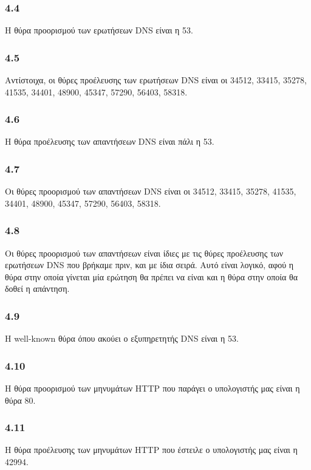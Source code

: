 		\subsubsection*{4.4}
			Η θύρα προορισμού των ερωτήσεων DNS είναι η 53.
		
		\subsubsection*{4.5}
			Αντίστοιχα, οι θύρες προέλευσης των ερωτήσεων DNS είναι οι 34512, 33415, 35278, 41535, 34401, 48900, 45347, 57290, 56403, 58318.
			
		
		\subsubsection*{4.6}
			Η θύρα προέλευσης των απαντήσεων DNS είναι πάλι η 53.
		
		\subsubsection*{4.7}
			Οι θύρες προορισμού των απαντήσεων DNS είναι οι 34512, 33415, 35278, 41535, 34401, 48900, 45347, 57290, 56403, 58318. 
		
		\subsubsection*{4.8}
			Οι θύρες προορισμού των απαντήσεων είναι ίδιες με τις θύρες προέλευσης των ερωτήσεων DNS που βρήκαμε πριν, και με ίδια σειρά. Αυτό είναι λογικό, αφού η θύρα στην οποία γίνεται μία ερώτηση θα πρέπει να είναι και η θύρα στην οποία θα δοθεί η απάντηση.
		
		\subsubsection*{4.9}
			Η well-known θύρα όπου ακούει ο εξυπηρετητής DNS είναι η 53.
		
		\subsubsection*{4.10}
			Η θύρα προορισμού των μηνυμάτων HTTP που παράγει ο υπολογιστής μας είναι η θύρα 80.
		
		\subsubsection*{4.11}
			Η θύρα προέλευσης των μηνυμάτων HTTP που έστειλε ο υπολογιστής μας είναι η 42994.
		
